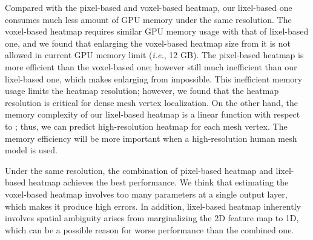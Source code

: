 \documentclass[runningheads]{llncs}
\begin{document}
Compared with the pixel-based and voxel-based heatmap, our lixel-based one consumes much less amount of GPU memory under the same resolution.
The  voxel-based heatmap requires similar GPU memory usage with that of  lixel-based one, and we found that enlarging the voxel-based heatmap size from it is not allowed in current GPU memory limit (\textit{i.e.}, 12 GB).
The pixel-based heatmap is more efficient than the voxel-based one; however still much inefficient than our lixel-based one, which makes enlarging from  impossible.
This inefficient memory usage limits the heatmap resolution; however, we found that the heatmap resolution is critical for dense mesh vertex localization.
On the other hand, the memory complexity of our lixel-based heatmap is a linear function with respect to ; thus, we can predict high-resolution heatmap for each mesh vertex.
The memory efficiency will be more important when a high-resolution human mesh model is used.


Under the same resolution, the combination of pixel-based heatmap and lixel-based heatmap achieves the best performance.
We think that estimating the voxel-based heatmap involves too many parameters at a single output layer, which makes it produce high errors.
In addition, lixel-based heatmap inherently involves spatial ambiguity arises from marginalizing the 2D feature map to 1D, which can be a possible reason for worse performance than the combined one.

\begin{table}[t]
\setlength{\tabcolsep}{1pt}
\centering
{}
\caption{The MPJPE and PA MPJPE comparison on Human3.6M and 3DPW. All methods are trained on Human3.6M and MSCOCO.}
\label{table:compare_h36m_3dpw_same_dataset}
\end{table}
\end{document}

